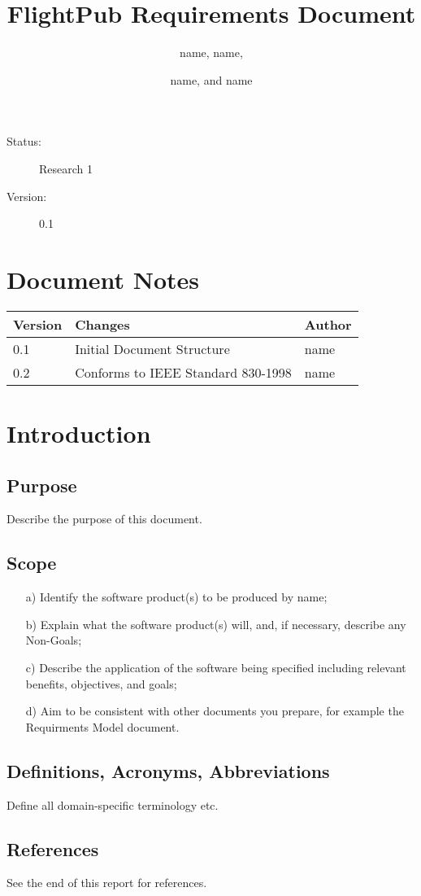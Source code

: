 \documentclass[english,12pt]{scrartcl}
\title{FlightPub Requirements Document}
\author{name, name, \and name, and name}
\begin{document}
	\maketitle
	\vfill
	{\large
		\begin{description}
			\item [Status:] Research 1
			\item [Version:] 0.1
		\end{description}
	}
	\clearpage
	\tableofcontents
	\clearpage
	
	\section{Document Notes}
		\begin{tabular}{ | p{} | p{} | p{} |}
			\hline
			\textbf{Version} & \textbf{Changes} & \textbf{Author} \\
			\hline

			0.1 &
			Initial Document Structure &
			name \\
			\hline

			0.2 &
			Conforms to IEEE Standard 830-1998 \cite{IEEE830} &
			name \\
			\hline
		\end{tabular}
		
	\clearpage
	
	\section{Introduction} {
	
		\subsection{Purpose} {
			Describe the purpose of this document.
		}
		\subsection{Scope} {
			\begin{itemize}
				\item[a)] Identify the software product(s) to be produced by name;
				\item[b)] Explain what the software product(s) will, and, if necessary, describe any Non-Goals;
				\item[c)] Describe the application of the software being specified including relevant benefits, objectives, and goals;			
				\item[d)] Aim to be consistent with other documents you prepare, for example the Requirments Model document.
			\end{itemize}
		}
	
		\subsection{Definitions, Acronyms, Abbreviations}{
			Define all domain-specific terminology etc.
		}
		\subsection{References} {
			See the end of this report for references.
		}
		\clearpage
	}
	
\end{document}
